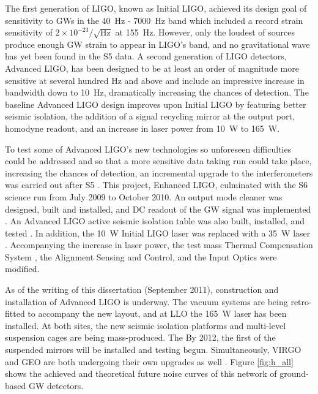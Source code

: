 The first generation of LIGO, known as Initial LIGO, achieved its
design goal of sensitivity to GWs in the 40~Hz - 7000~Hz band which
included a record strain sensitivity of
$2\times10^{-23}/\sqrt{\mathrm{Hz}}$ at 155~Hz. However, only the
loudest of sources produce enough GW strain to appear in LIGO's band,
and no gravitational wave has yet been found in the S5 data. A second
generation of LIGO detectors, Advanced LIGO, has been designed to be
at least an order of magnitude more sensitive at several hundred Hz
and above and include an impressive increase in bandwidth down to
10~Hz, dramatically increasing the chances of detection. The baseline
Advanced LIGO design \cite{AdvLigoSysDesign} improves upon Initial
LIGO by featuring better seismic isolation, the addition of a signal
recycling mirror at the output port, homodyne readout, and an increase
in laser power from 10~W to 165~W.

To test some of Advanced LIGO's new technologies so unforeseen
difficulties could be addressed and so that a more sensitive data
taking run could take place, increasing the chances of detection, an
incremental upgrade to the interferometers was carried out after S5
\cite{Adhikari2006Enhanced}. This project, Enhanced LIGO, culminated
with the S6 science run from July 2009 to October 2010.  An output
mode cleaner was designed, built and installed, and DC readout of the
GW signal was implemented \cite{Fricke2011DC}. An Advanced LIGO active
seismic isolation table was also built, installed, and tested
\cite[Ch. 5]{KisselThesis}. In addition, the 10~W Initial LIGO laser
was replaced with a 35~W laser
\cite{Frede2007Fundamental}. Accompanying the increase in laser power,
the test mass Thermal Compensation System \cite{Willems2009Thermal},
the Alignment Sensing and Control, and the Input Optics were modified.

As of the writing of this dissertation (September 2011), construction
and installation of Advanced LIGO is underway. The vacuum systems are
being retro-fitted to accompany the new layout, and at LLO the 165~W
laser has been installed. At both sites, the new seismic isolation
platforms and multi-level suspension cages are being
mass-produced. The By 2012, the first of the suspended mirrors will be
installed and testing begun. Simultaneously, VIRGO and GEO are both
undergoing their own upgrades as well \cite{Acernese2008Virgo}
\cite{Luck2010Upgrade}. Figure \ref{fig:h_all} shows the achieved and
theoretical future noise curves of this network of ground-based GW
detectors.

